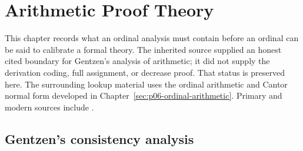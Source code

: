 
\chapter{Arithmetic Proof Theory}
\label{sec:p07-arithmetic-proof-theory}

This chapter records what an ordinal analysis must contain before an ordinal
can be said to calibrate a formal theory.  The inherited source supplied an
honest cited boundary for Gentzen's analysis of arithmetic; it did not supply
the derivation coding, full assignment, or decrease proof.  That status is
preserved here.  The surrounding lookup material uses the ordinal arithmetic
and Cantor normal form developed in
Chapter~\ref{sec:p06-ordinal-arithmetic}.  Primary and modern sources include
\cite{Gentzen1936,Gentzen1938,TroelstraSchwichtenberg2000,
Takeuti1987,Schwichtenberg1977}.

\section{Gentzen's consistency analysis}
\label{sec:p07-gentzen-analysis}

